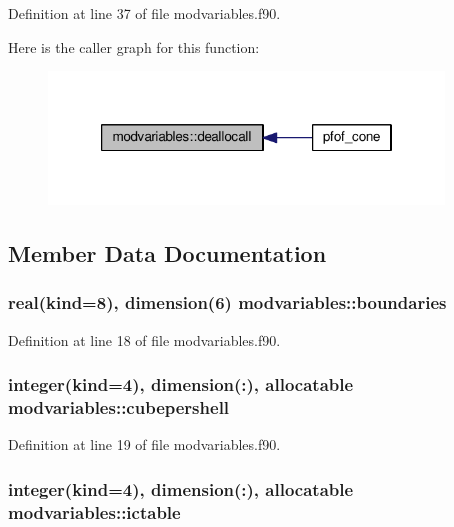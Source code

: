 Definition at line 37 of file modvariables.\-f90.



Here is the caller graph for this function\-:\nopagebreak
\begin{figure}[H]
\begin{center}
\leavevmode
\includegraphics[width=298pt]{classmodvariables_a1b90ef0a0d8979fdfc0a578bbd2f3e17_icgraph}
\end{center}
\end{figure}




\subsection{Member Data Documentation}
\hypertarget{classmodvariables_a45ca9fc03093230dfc1beb56cacb8e80}{
\subsubsection[{boundaries}]{\setlength{\rightskip}{0pt plus 5cm}real(kind=8), dimension(6) modvariables\-::boundaries}}\label{classmodvariables_a45ca9fc03093230dfc1beb56cacb8e80}


Definition at line 18 of file modvariables.\-f90.

\hypertarget{classmodvariables_a2c3c2168db3dc7c7b511d9c5a2715de5}{
\subsubsection[{cubepershell}]{\setlength{\rightskip}{0pt plus 5cm}integer(kind=4), dimension(\-:), allocatable modvariables\-::cubepershell}}\label{classmodvariables_a2c3c2168db3dc7c7b511d9c5a2715de5}


Definition at line 19 of file modvariables.\-f90.

\hypertarget{classmodvariables_a2de620524061386e6addabfa15a6b020}{
\subsubsection[{ictable}]{\setlength{\rightskip}{0pt plus 5cm}integer(kind=4), dimension(\-:), allocatable modvariables\-::ictable}}\label{classmodvariables_a2de620524061386e6addabfa15a6b020}


